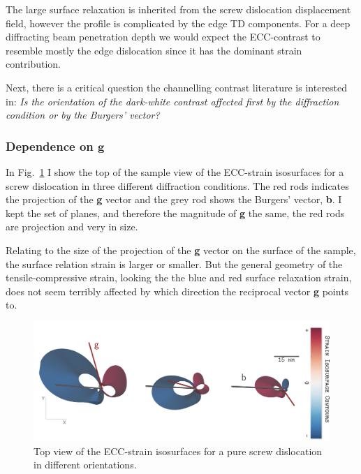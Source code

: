 The large surface relaxation is inherited from the screw dislocation displacement field, however the profile is complicated by the edge TD components. For a deep diffracting beam penetration depth we would expect the ECC-contrast to resemble mostly the edge dislocation since it has the dominant strain contribution. 


Next, there is a critical question the channelling contrast literature is interested in: \textit{Is the orientation of the dark-white contrast affected first by the diffraction condition or by the Burgers' vector?}

\subsubsection{Dependence on \texorpdfstring{$\mathbf{g}$}{g}}
In Fig.~\ref{fig:gdependence} I show the top of the sample view of the ECC-strain isosurfaces for a screw dislocation in three different diffraction conditions. The red rods indicates the projection of the \textbf{g} vector and the grey rod shows the Burgers' vector, \textbf{b}. I kept the set of planes, and therefore the magnitude of \textbf{g} the same, the red rods are projection and very in size. 

Relating to the size of the projection of the \textbf{g} vector on the surface of the sample, the surface relation strain is larger or smaller. But the general geometry of the tensile-compressive strain, looking the the blue and red surface relaxation strain, does not seem terribly affected by which direction the reciprocal vector \textbf{g} points to. 

\begin{figure}[ht]
    \centering
    \includegraphics[width=0.95\linewidth]{Figures/gdependence.png}
    \caption[Screw TD ECCI-strain in different orientations.]{Top view of the ECC-strain isosurfaces for a pure screw dislocation in different orientations.  }
    \label{fig:gdependence}
\end{figure}

